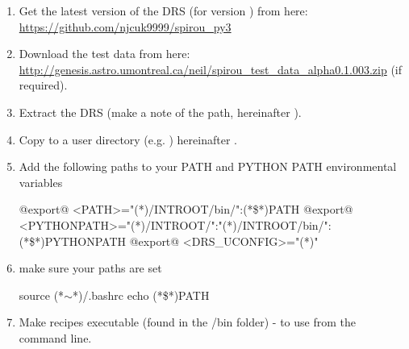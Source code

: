 \begin{enumerate}

\item Get the latest version of the DRS (for \instrument version \MyCodeVersion) from here: \url{https://github.com/njcuk9999/spirou_py3}

\item Download the test data from here: \url{http://genesis.astro.umontreal.ca/neil/spirou_test_data_alpha0.1.003.zip} (if required).

\item Extract the DRS (make a note of the path, hereinafter \InstallDIR).

\item Copy \InstallDIR{} to a user directory (e.g. ) hereinafter \userDIR.

\item Add the following paths to your PATH and PYTHON PATH environmental variables

	\begin{bashbox}[title={e.g. in $\sim$/.bashrc}]
	@export@ <PATH>="(*\InstallDIR*)/INTROOT/bin/":(*\$*)PATH
	@export@ <PYTHONPATH>="(*\InstallDIR*)/INTROOT/":"(*\InstallDIR*)/INTROOT/bin/":(*\$*)PYTHONPATH
	@export@ <DRS_UCONFIG>="(*\userDIR*)"
	\end{bashbox}

\item make sure your paths are set
	\begin{cmdbox}
	source (*$\sim$*)/.bashrc
	echo (*\$*)PATH
	\end{cmdbox}

\item Make recipes executable (found in the \InstallDIR/bin folder) - to use from the command line.


\end{enumerate}
